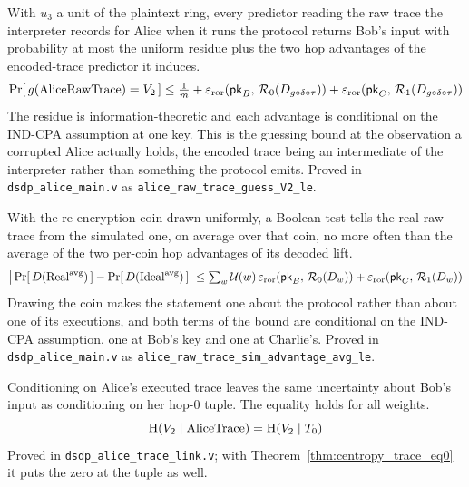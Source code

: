 \begin{theorem}
  \label{thm:raw_trace_guess}
  \rocqok
  With $u_3$ a unit of the plaintext ring, every predictor reading the raw
  trace the interpreter records for Alice when it runs the protocol returns
  Bob's input with probability at most the uniform residue plus the two hop
  advantages of the encoded-trace predictor it induces.
  \[ \Pr[\,g(\mathrm{AliceRawTrace}) = V_2\,]
       \le \tfrac{1}{m} + \varepsilon_{\mathrm{ror}}(\mathsf{pk}_B,\,\mathcal{R}_{0}(D_{g \circ \delta \circ \tau})) + \varepsilon_{\mathrm{ror}}(\mathsf{pk}_C,\,\mathcal{R}_{1}(D_{g \circ \delta \circ \tau})) \]
  The residue is information-theoretic and each advantage is conditional on the
  IND-CPA assumption at one key. This is the guessing bound at the observation
  a corrupted Alice actually holds, the encoded trace being an intermediate of
  the interpreter rather than something the protocol emits.
  Proved in \texttt{dsdp\_alice\_main.v} as
  \texttt{alice\_raw\_trace\_guess\_V2\_le}.
\end{theorem}

\begin{theorem}
  \label{thm:raw_trace_simulation}
  \rocqok
  With the re-encryption coin drawn uniformly, a Boolean test tells the real
  raw trace from the simulated one, on average over that coin, no more often
  than the average of the two per-coin hop advantages of its decoded lift.
  \[ \big| \Pr[\,D(\mathrm{Real}^{\mathrm{avg}})\,]
       - \Pr[\,D(\mathrm{Ideal}^{\mathrm{avg}})\,] \big|
     \le \textstyle\sum_w \mathcal{U}(w)\,\varepsilon_{\mathrm{ror}}(\mathsf{pk}_B,\,\mathcal{R}_{0}(D_w)) + \varepsilon_{\mathrm{ror}}(\mathsf{pk}_C,\,\mathcal{R}_{1}(D_w)) \]
  Drawing the coin makes the statement one about the protocol rather than about
  one of its executions, and both terms of the bound are conditional on the
  IND-CPA assumption, one at Bob's key and one at Charlie's.
  Proved in \texttt{dsdp\_alice\_main.v} as
  \texttt{alice\_raw\_trace\_sim\_advantage\_avg\_le}.
\end{theorem}

\begin{theorem}
  \label{thm:centropy_trace_tuple}
  \rocqok
  Conditioning on Alice's executed trace leaves the same uncertainty about
  Bob's input as conditioning on her hop-$0$ tuple. The equality holds for all
  weights.
  \[ \mathrm{H}(V_2 \mid \mathrm{AliceTrace}) = \mathrm{H}(V_2 \mid T_{0}) \]
  Proved in \texttt{dsdp\_alice\_trace\_link.v}; with
  Theorem~\ref{thm:centropy_trace_eq0} it puts the zero at the tuple as well.
\end{theorem}

